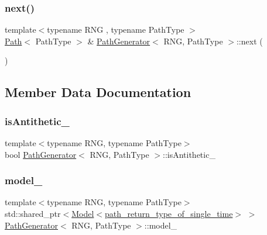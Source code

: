 \subsubsection{\texorpdfstring{next()}{next()}}
{\footnotesize\ttfamily template$<$typename R\+NG , typename Path\+Type $>$ \\
\hyperlink{class_path}{Path}$<$ Path\+Type $>$ \& \hyperlink{class_path_generator}{Path\+Generator}$<$ R\+NG, Path\+Type $>$\+::next (\begin{DoxyParamCaption}{ }\end{DoxyParamCaption})}



\subsection{Member Data Documentation}
\hypertarget{class_path_generator_a936af20e588195ca95d02cc302ea5d8b}{}\label{class_path_generator_a936af20e588195ca95d02cc302ea5d8b} 
\subsubsection{\texorpdfstring{is\+Antithetic\+\_\+}{isAntithetic\_}}
{\footnotesize\ttfamily template$<$typename R\+NG, typename Path\+Type$>$ \\
bool \hyperlink{class_path_generator}{Path\+Generator}$<$ R\+NG, Path\+Type $>$\+::is\+Antithetic\+\_\+\hspace{0.3cm}{\ttfamily [private]}}

\hypertarget{class_path_generator_a92eef9405a03784534b561f56080ed8b}{}\label{class_path_generator_a92eef9405a03784534b561f56080ed8b} 
\subsubsection{\texorpdfstring{model\+\_\+}{model\_}}
{\footnotesize\ttfamily template$<$typename R\+NG, typename Path\+Type$>$ \\
std\+::shared\+\_\+ptr$<$\hyperlink{class_model}{Model}$<$\hyperlink{class_path_generator_a467bc3ddaa5e9104170550617e767349}{path\+\_\+return\+\_\+type\+\_\+of\+\_\+single\+\_\+time}$>$ $>$ \hyperlink{class_path_generator}{Path\+Generator}$<$ R\+NG, Path\+Type $>$\+::model\+\_\+\hspace{0.3cm}{\ttfamily [private]}}

